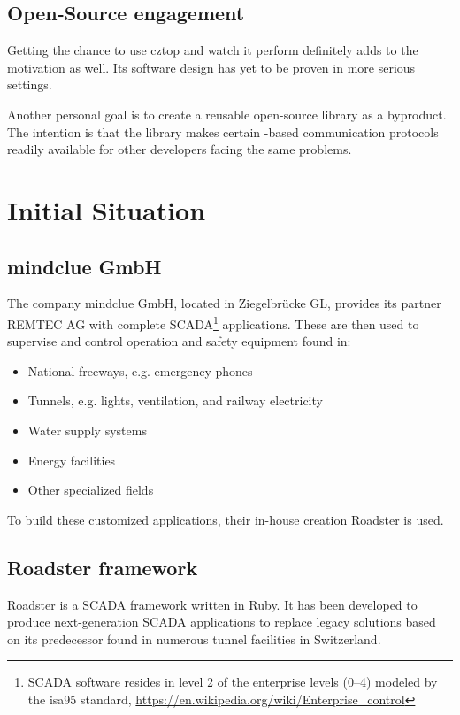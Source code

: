 \subsection{Open-Source engagement}
Getting the chance to use \gls{cztop} and watch it perform definitely adds to
the motivation as well. Its software design has yet to be proven in more
serious settings.

Another personal goal is to create a reusable open-source library as a
byproduct. The intention is that the library makes certain \zmq-based
communication protocols readily available for other developers facing the same
problems.

\section{Initial Situation}

\subsection{mindclue GmbH}
The company mindclue GmbH, located in Ziegelbr\"ucke GL, provides its partner
REMTEC AG with complete \gls{SCADA}\footnote{SCADA software resides in level 2 of the enterprise levels (0--4) modeled by the \gls{isa95} standard, \url{https://en.wikipedia.org/wiki/Enterprise_control}} applications. These are then used to
supervise and control operation and safety equipment found in:

\begin{itemize}
\item National freeways, e.g. emergency phones
\item Tunnels, e.g. lights, ventilation, and railway electricity
\item Water supply systems
\item Energy facilities
\item Other specialized fields
\end{itemize}

To build these customized applications, their in-house creation
Roadster is used.

\subsection{Roadster framework}
Roadster is a SCADA framework written in Ruby. It has been developed to
produce next-generation SCADA applications to replace legacy
solutions based on its predecessor found in numerous tunnel
facilities in Switzerland.


